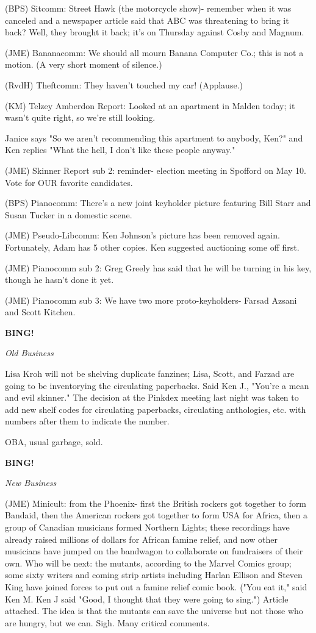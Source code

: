 \documentclass[12pt]{article}
\newcommand{\bing}{{\bf BING!} }
\newcommand{\goto}[1]{\bing \vskip 12pt \centerline{{\em{#1}}}}
\begin{document}
(BPS) Sitcomm: Street Hawk (the motorcycle show)- remember when it was canceled and a newspaper article said that ABC was threatening to bring it back? Well, they brought it back; it's on Thursday against Cosby and Magnum.

(JME) Bananacomm: We should all mourn Banana Computer Co.; this is not a motion. (A very short moment of silence.)

(RvdH) Theftcomm: They haven't touched my car! (Applause.)

(KM) Telzey Amberdon Report: Looked at an apartment in Malden today; it wasn't quite right, so we're still looking.

Janice says "So we aren't recommending this apartment to anybody, Ken?" and Ken replies "What the hell, I don't like these people anyway."

(JME) Skinner Report sub 2: reminder- election meeting in Spofford on May 10. Vote for OUR favorite candidates.

(BPS) Pianocomm: There's a new joint keyholder picture featuring Bill Starr and Susan Tucker in a domestic scene.

(JME) Pseudo-Libcomm: Ken Johnson's picture has been removed again. Fortunately, Adam has 5 other copies. Ken suggested auctioning some off first.

(JME) Pianocomm sub 2: Greg Greely has said that he will be turning in his key, though he hasn't done it yet.

(JME) Pianocomm sub 3: We have two more proto-keyholders- Farsad Azsani and Scott Kitchen.

\goto{Old Business}

Lisa Kroh will not be shelving duplicate fanzines; Lisa, Scott, and Farzad are going to be inventorying the circulating paperbacks. Said Ken J., "You're a mean and evil skinner." The decision at the Pinkdex meeting last night was taken to add new shelf codes for circulating paperbacks, circulating anthologies, etc. with numbers after them to indicate the number.

OBA, usual garbage, sold.

\goto{New Business}

(JME) Minicult: from the Phoenix- first the British rockers got together to form Bandaid, then the American rockers got together to form USA for Africa, then a group of Canadian musicians formed Northern Lights; these recordings have already raised millions of dollars for African famine relief, and now other musicians have jumped on the bandwagon to collaborate on fundraisers of their own. Who will be next: the mutants, according to the Marvel Comics group; some sixty writers and coming strip artists including Harlan Ellison and Steven King have joined forces to put out a famine relief comic book. ("You eat it," said Ken M. Ken J said "Good, I thought that they were going to sing.") Article attached. The idea is that the mutants can save the universe but not those who are hungry, but we can. Sigh. Many critical comments.
\end{document}
